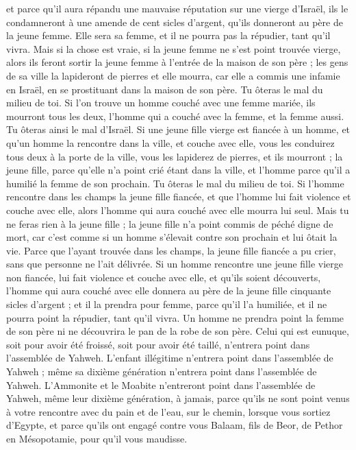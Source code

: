 \begin{multicols}{2}
et parce qu'il aura répandu une mauvaise réputation sur une vierge d'Israël, ils le condamneront à une amende de cent sicles d'argent, qu’ils donneront au père de la jeune femme. Elle sera sa femme, et il ne pourra pas la répudier, tant qu'il vivra.
Mais si la chose est vraie, si la jeune femme ne s’est point trouvée vierge,
alors ils feront sortir la jeune femme à l’entrée de la maison de son père ; les gens de sa ville la lapideront de pierres et elle mourra, car elle a commis une infamie en Israël, en se prostituant dans la maison de son père. Tu ôteras le mal du milieu de toi.
Si l’on trouve un homme couché avec une femme mariée, ils mourront tous les deux, l'homme qui a couché avec la femme, et la femme aussi. Tu ôteras ainsi le mal d'Israël.
Si une jeune fille vierge est fiancée à un homme, et qu’un homme la rencontre dans la ville, et couche avec elle,
vous les conduirez tous deux à la porte de la ville, vous les lapiderez de pierres, et ils mourront ; la jeune fille, parce qu'elle n’a point crié étant dans la ville, et l'homme parce qu'il a humilié la femme de son prochain. Tu ôteras le mal du milieu de toi.
Si l’homme rencontre dans les champs la jeune fille fiancée, et que l’homme lui fait violence et couche avec elle, alors l'homme qui aura couché avec elle mourra lui seul.
Mais tu ne feras rien à la jeune fille ; la jeune fille n'a point commis de péché digne de mort, car c’est comme si un homme s'élevait contre son prochain et lui ôtait la vie.
Parce que l'ayant trouvée dans les champs, la jeune fille fiancée a pu crier, sans que personne ne l’ait délivrée.
Si un homme rencontre une jeune fille vierge non fiancée, lui fait violence et couche avec elle, et qu'ils soient découverts,
l'homme qui aura couché avec elle donnera au père de la jeune fille cinquante sicles d'argent ; et il la prendra pour femme, parce qu'il l'a humiliée, et il ne pourra point la répudier, tant qu'il vivra.
Un homme ne prendra point la femme de son père ni ne découvrira le pan de la robe de son père.
\VerseOne{}Celui qui est eunuque, soit pour avoir été froissé, soit pour avoir été taillé, n'entrera point dans l'assemblée de Yahweh.
L’enfant illégitime n'entrera point dans l'assemblée de Yahweh ; même sa dixième génération n'entrera point dans l'assemblée de Yahweh.
L’Ammonite et le Moabite n'entreront point dans l'assemblée de Yahweh, même leur dixième génération, à jamais,
parce qu'ils ne sont point venus à votre rencontre avec du pain et de l'eau, sur le chemin, lorsque vous sortiez d'Egypte, et parce qu'ils ont engagé contre vous Balaam, fils de Beor, de Pethor en Mésopotamie, pour qu’il vous maudisse.

\end{multicols}
